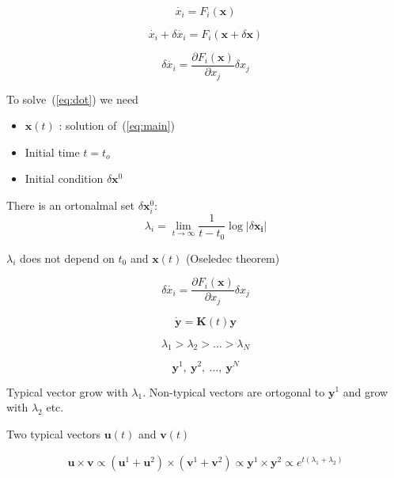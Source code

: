 \topline

\begin{equation} \label{eq:main}
\dot{x_i} = F_i(\mathbf{x})
\end{equation}

\begin{equation}
\dot{x_i} + \delta \dot{x_i} = F_i(\mathbf{x} + \delta \mathbf{x})
\end{equation}

\begin{equation} \label{eq:dot}
\delta \dot{x_i} = \frac{\partial F_i(\mathbf{x})}{\partial x_j} \delta x_j
\end{equation}

To solve~(\ref{eq:dot}) we need
\begin{itemize}
\item $\mathbf{x}(t)$ : solution of~(\ref{eq:main})
\item Initial time $t = t_o$
\item Initial condition $\delta \mathbf{x}^0$
\end{itemize}

There is an ortonalmal set $\delta \mathbf{x}^0_i$:
\begin{equation*}
\lambda_i = \lim_{t\to\infty} \frac{1}{t - t_0} \log | \delta \mathbf{x_i} |
\end{equation*}

$\lambda_i$ does not depend on $t_0$ and $\mathbf{x}(t)$ (Oseledec
theorem)

\eframe


\begin{equation*}
\delta \dot{x_i} = \frac{\partial F_i(\mathbf{x})}{\partial x_j} \delta x_j
\end{equation*}

\begin{equation*}
\dot{\mathbf{y}} = \mathbf{K}(t) \mathbf{y}
\end{equation*}

\begin{equation*}
\lambda_1 > \lambda_2 > \ldots > \lambda_N
\end{equation*}

\begin{equation*}
\mathbf{y}^1,\ \mathbf{y}^2,\ \ldots,\ \mathbf{y}^N
\end{equation*}

Typical vector grow with $\lambda_1$. Non-typical vectors are
ortogonal to $\mathbf{y}^1$ and grow with $\lambda_2$ etc.

\eframe

Two typical vectors $\mathbf{u}(t)$ and $\mathbf{v}(t)$

\begin{align*}
    \mathbf{u}
    \times
    \mathbf{v}
    \propto
    (\mathbf{u}^1 + \mathbf{u}^2)
    \times
    (\mathbf{v}^1 + \mathbf{v}^2)
    \propto
    \mathbf{y}^1
    \times
    \mathbf{y}^2
    \propto
    e^{t(\lambda_1 + \lambda_2)}
\end{align*}
\eframe
